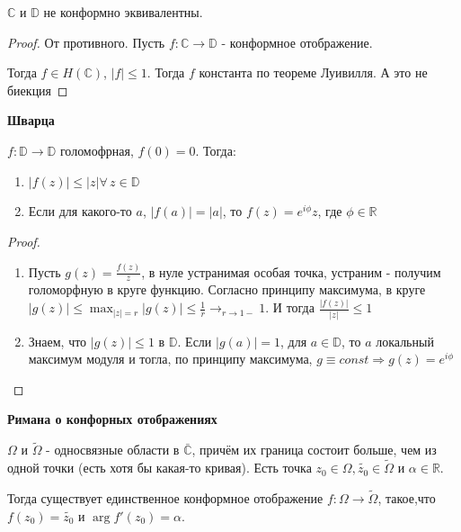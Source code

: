 \begin{theorem}
    $\mathbb{C}$ и $\mathbb{D}$ не конформно эквивалентны.
\end{theorem}

\begin{proof}
    От противного. Пусть $f : \mathbb{C} \to \mathbb{D}$ - конформное отображение.

    Тогда $f \in H(\mathbb{C})$, $|f| \leqslant 1$. Тогда $f$ константа
    по теореме Луивилля. А это не биекция
\end{proof}

\begin{lemma}
    \textbf{Шварца}

    $f : \mathbb{D} \to \mathbb{D}$ голомофрная, $f(0) = 0$. Тогда:
    \begin{enumerate}
        \item $|f(z)| \leqslant |z| \forall \, z \in \mathbb{D}$
        \item Если для какого-то $a$, $|f(a)| = |a|$, то $f(z) = e^{i\phi} z$, где $\phi \in \mathbb{R}$
    \end{enumerate}
\end{lemma}

\begin{proof}
    \begin{enumerate}
        \item {
            Пусть $g(z) = \frac{f(z)}{z}$, в нуле устранимая особая точка, устраним - получим голоморфную в круге функцию.
            Согласно принципу максимума, в круге $|g(z)| \leqslant \max_{|z| = r} |g(z)| \leqslant \frac{1}{r} \rightarrow_{r \to 1-} 1$.
            И тогда $\frac{|f(z)|}{|z|} \leqslant 1$
        }
        \item {
            Знаем, что $|g(z)| \leqslant 1$ в $\mathbb{D}$. Если $|g(a)| = 1$, для $a \in \mathbb{D}$, то 
            $a$ локальный максимум модуля и тогла, по принципу максимума, $g \equiv const \Rightarrow g(z) = e^{i\phi}$
        }
    \end{enumerate}
    
\end{proof}

\begin{theorem}
    \textbf{Римана о конфорных отображениях}

    $\Omega$ и $\tilde{\Omega}$ - односвязные области в $\bar{\mathbb{C}}$, причём их
    граница состоит больше, чем из одной точки (есть хотя бы какая-то кривая).
    Есть точка $z_0 \in \Omega, \tilde{z_0} \in \tilde{\Omega}$ и $\alpha \in \mathbb{R}$.

    Тогда существует единственное конформное отображение $f : \Omega \to \tilde{\Omega}$, такое,что
    $f(z_0) = \tilde{z_0}$ и $\arg f'(z_0) = \alpha$.
\end{theorem}

